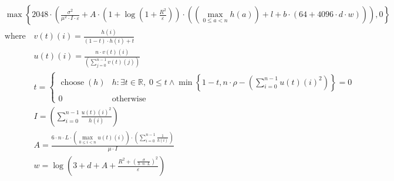 \[\begin{aligned} &\max\left\{ 2048 \cdot \left(\frac{\sigma^{2}}{\mu^{2} \cdot I \cdot \varepsilon} + A \cdot \left(1 + \log\left(1 + \frac{R^{2}}{\varepsilon}\right)\right) \cdot \left(\left(\max_{0\le a<n} h\left(a\right)\right) + l + b \cdot \left(64 + 4096 \cdot d \cdot w\right)\right)\right), 0 \right\} \\ &\text{where}\quad v\left(t\right)\left(i\right) = \frac{h\left(i\right)}{\left(1 - t\right) \cdot h\left(i\right) + t} \\ &\phantom{\text{where}\quad} u\left(t\right)\left(i\right) = \frac{n \cdot v\left(t\right)\left(i\right)}{\left(\sum_{j=0}^{n-1} v\left(t\right)\left(j\right)\right)} \\ &\phantom{\text{where}\quad} t = \begin{cases} \operatorname{choose}\left(h\right) & h : \exists t\in \mathbb{R},\;0 \leq t \land \min\left\{ 1 - t, n \cdot \rho - \left(\sum_{i=0}^{n-1} u\left(t\right)\left(i\right)^{2}\right) \right\} = 0 \\ 0 & \mathrm{otherwise} \end{cases} \\ &\phantom{\text{where}\quad} I = \left(\sum_{i=0}^{n-1} \frac{u\left(t\right)\left(i\right)^{2}}{h\left(i\right)}\right) \\ &\phantom{\text{where}\quad} A = \frac{6 \cdot n \cdot L \cdot \left(\max_{0\le i<n} u\left(t\right)\left(i\right)\right) \cdot \left(\sum_{i=0}^{n-1} \frac{1}{h\left(i\right)}\right)}{\mu \cdot I} \\ &\phantom{\text{where}\quad} w = \log\left(3 + d + A + \frac{R^{2} + \left(\frac{\sigma}{3 \cdot n \cdot L}\right)^{2}}{\varepsilon}\right)\end{aligned}\]
